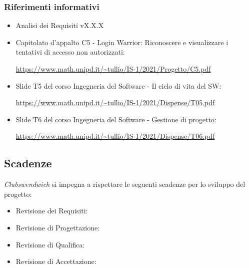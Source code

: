 \subsubsection{Riferimenti informativi}
\begin{itemize}
    \item Analisi dei Requisiti vX.X.X
    \item Capitolato d'appalto C5 - Login Warrior: Riconoscere e visualizzare i tentativi di accesso non autorizzati: \par \url{https://www.math.unipd.it/~tullio/IS-1/2021/Progetto/C5.pdf}
    \item Slide T5 del corso Ingegneria del Software - Il ciclo di vita del SW: \par \url{https://www.math.unipd.it/~tullio/IS-1/2021/Dispense/T05.pdf}
    \item Slide T6 del corso Ingegneria del Software - Gestione di progetto: \par \url{https://www.math.unipd.it/~tullio/IS-1/2021/Dispense/T06.pdf}
\end{itemize}
\subsection{Scadenze}
\textit{Clubswendwich} si impegna a rispettare le seguenti scadenze per lo sviluppo del progetto:
\begin{itemize}
    \item Revisione dei Requisiti: 
    \item Revisione di Progettazione:
    \item Revisione di Qualifica:
    \item Revisione di Accettazione:
\end{itemize}